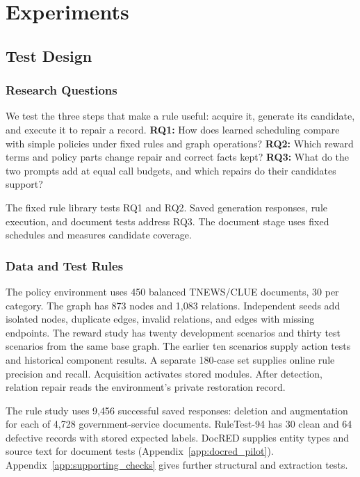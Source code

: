 \section{Experiments}

\label{sec:experiments}

\subsection{Test Design}

\subsubsection{Research Questions}

\label{subsubsec:evaluation_questions}

We test the three steps that make a rule useful: acquire it, generate
its candidate, and execute it to repair a record.
\textbf{RQ1:} How does learned scheduling compare with simple policies
under fixed rules and graph operations?
\textbf{RQ2:} Which reward terms and policy parts change repair and
correct facts kept?
\textbf{RQ3:} What do the two prompts add at equal call budgets,
and which repairs do their candidates support?

The fixed rule library tests RQ1 and RQ2. Saved generation responses,
rule execution, and document tests address RQ3. The document stage uses
fixed schedules and measures candidate coverage.

\subsubsection{Data and Test Rules}

\label{subsubsec:testset}

The policy environment uses 450 balanced TNEWS/CLUE documents, 30 per
category. The graph has 873 nodes and 1,083 relations. Independent seeds
add isolated nodes, duplicate edges, invalid relations, and edges with
missing endpoints. The reward study has twenty development scenarios
and thirty test scenarios from the same base graph. The earlier ten
scenarios supply action tests and historical component results.
A separate 180-case set supplies online rule precision and recall.
Acquisition activates stored modules. After detection, relation repair
reads the environment's private restoration record.

The rule study uses 9,456 successful saved responses: deletion and
augmentation for each of 4,728 government-service documents.
RuleTest-94 has 30 clean and 64 defective records with stored expected
labels. DocRED supplies entity types and source text for document tests
(Appendix~\ref{app:docred_pilot}). Appendix~\ref{app:supporting_checks}
gives further structural and extraction tests.

